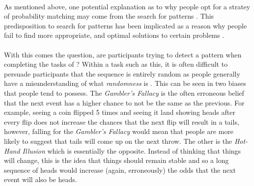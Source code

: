\documentclass[12pt]{article}
\begin{document}
\paragraph{} As mentioned above, one potential explanation as to why people opt for a stratey of probability matching may come from the search for patterns \citep{yellott1969probability}. This predisposition to search for patterns has been implicated as a reason why people fail to find more appropriate, and optimal solutions to  certain problems \citep{wolford2004searching}.  %

\paragraph{} With this comes the question, are participants trying to detect a pattern when completing the tasks of \cite{clarke2015failure}? Within a task such as this, it is often difficult to persuade participants that the sequence is entirely random as people generally have a misunderstanding of what \textit{randomness} is \citep{Ayton2004}. This can be seen in two biases that people tend to possess. The \textit{Gambler's Fallacy} is the often erroneous belief that the next event has a higher chance to not be the same as the previous. For example, seeing a coin flipped 5 times and seeing it land showing heads after every flip does not increase the chances that the next flip will result in a tails, however, falling for the \textit{Gambler's Fallacy} would mean that people are more likely to suggest that tails will come up on the next throw. The other is the \textit{Hot-Hand Illusion} which is essentially the opposite. Instead of thinking that things will change, this is the idea that things should remain stable and so a long sequence of heads would increase (again, erroneously) the odds that the next event will also be heads.  
\end{document}
